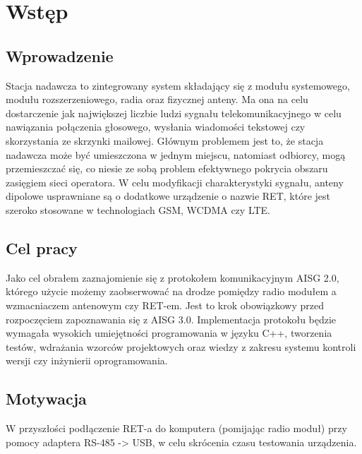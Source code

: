 \chapter{Wstęp}
\section{Wprowadzenie}
	Stacja nadawcza to zintegrowany system składający się z modułu systemowego, modułu rozszerzeniowego, radia oraz fizycznej anteny. 
	Ma ona na celu dostarczenie jak największej liczbie ludzi sygnału telekomunikacyjnego w celu nawiązania połączenia głosowego, 
	wysłania wiadomości tekstowej czy skorzystania ze skrzynki mailowej. Głównym problemem jest to, że stacja nadawcza może być umieszczona w jednym miejscu, 
	natomiast odbiorcy, mogą przemieszczać się, co niesie ze sobą problem efektywnego pokrycia obszaru zasięgiem sieci operatora.
	W celu modyfikacji charakterystyki sygnału, anteny dipolowe usprawniane są o dodatkowe urządzenie o nazwie RET, które jest szeroko stosowane w technologiach GSM, WCDMA czy LTE.

\section{Cel pracy}
	Jako cel obrałem zaznajomienie się z protokołem komunikacyjnym AISG 2.0, którego użycie możemy zaobserwować na drodze pomiędzy 
	radio modułem a wzmacniaczem antenowym czy RET-em. 
	Jest to krok obowiązkowy przed rozpoczęciem zapoznawania się z AISG 3.0.
	Implementacja protokołu będzie wymagała wysokich umiejętności programowania w języku C++, 
	tworzenia testów, wdrażania wzorców projektowych oraz wiedzy z zakresu systemu kontroli wersji czy inżynierii oprogramowania.

\section{Motywacja}
	W przyszłości podłączenie RET-a do komputera (pomijając radio moduł) przy pomocy adaptera RS-485 -> USB, w celu skrócenia czasu testowania urządzenia.

